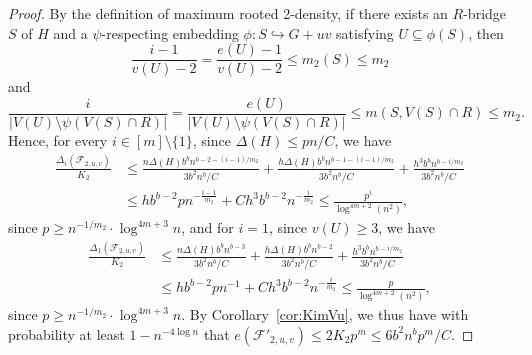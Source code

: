 \documentclass[11pt]{article}
\numberwithin{equation}{section}
\newcounter{i}
\theoremstyle{plain}
\theoremstyle{plain} %
\theoremstyle{definition}
\newcommand{\cF}{\mathcal{F}}
\begin{document}
\begin{proof}
By the definition of maximum rooted 2-density, if there exists an $R$-bridge $S$ of $H$ and a $\psi$-respecting embedding $\phi : S \hookrightarrow G + uv$ satisfying $U \subseteq \phi(S)$, then
\begin{equation*}
    \frac{i - 1}{v(U) - 2} = \frac{e(U) - 1}{v(U) - 2} \leq m_2(S) \leq m_2
\end{equation*}
and 
\begin{equation*}
    \frac{i}{|V(U)\setminus \psi(V(S)\cap R)|} = \frac{e(U)}{|V(U)\setminus \psi(V(S)\cap R)|} \leq m(S, V(S) \cap R) \leq m_2.
\end{equation*}
Hence, for every $i \in [m]\setminus\{1\}$, since $\Delta(H) \leq pn / C$, we have
\begin{align*}
    \frac{\Delta_i(\cF_{2,u,v})}{K_2} &\leq 
    \frac{n\Delta(H)b^bn^{b - 2 - (i-1)/m_2}}{3b^2n^b/C} + 
    \frac{h\Delta(H)b^bn^{b - 1 - (i-1)/m_2}}{3b^2n^b/C} + 
    \frac{h^3b^b n^{b - i/m_2}}{3b^2n^b/C} \\
    &\leq hb^{b-2}pn^{-\frac{i-1}{m_2}} + {Ch^3b^{b-2}}n^{-\frac{i}{m_2}}
     \leq \frac{p^i}{\log^{4m+2}(n^2)},
\end{align*}
since $p \geq n^{-1/m_2} \cdot \log^{4m+3}n $, and for $i = 1$, since $v(U) \geq 3$, we have
\begin{align*}
    \frac{\Delta_1(\cF_{2,u,v})}{K_2} &\leq 
    \frac{n\Delta(H)b^bn^{b - 3}}{3b^2n^b/C} + 
    \frac{h\Delta(H)b^bn^{b - 2}}{3b^2n^b/C} + 
    \frac{h^3b^b n^{b - i/m_2}}{3b^2n^b/C} \\
    &\leq hb^{b-2}pn^{-1} + {Ch^3b^{b-2}}n^{-\frac{i}{m_2}}
     \leq \frac{p}{\log^{4m+2}(n^2)},
\end{align*}
since $p \geq n^{-1/m_2} \cdot \log^{4m+3}n$.
By Corollary~\ref{cor:KimVu}, we thus have with probability at least $1-n^{-4\log n}$ that $e(\cF'_{2,u,v})\leq 2K_2p^{m} \leq 6b^2n^b p^m / C$. 


\end{proof}
\end{document}
